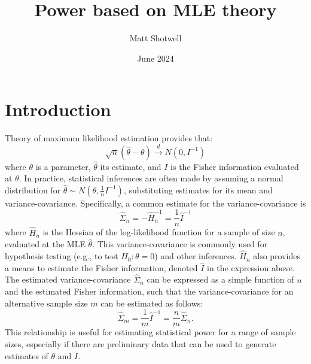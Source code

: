 \documentclass{article}
\title{Power based on MLE theory}
\author{Matt Shotwell}
\date{June 2024}
\begin{document}
\maketitle
\Large


\section{Introduction}
\noindent Theory of maximum likelihood estimation provides that:
$$
\sqrt{n}(\hat{\theta} - \theta) \stackrel{d}{\rightarrow} N(0, I^{-1})
$$
where $\theta$ is a parameter, $\hat{\theta}$ its estimate, and $I$ is the Fisher information evaluated at $\theta$. In practice, statistical inferences are often made by assuming a normal distribution for $\hat{\theta} \sim N(\theta, \frac{1}{n}I^{-1})$, substituting estimates for its mean and variance-covariance. Specifically, a common estimate for the variance-covariance is 
$$
\hat{\Sigma}_n = -\hat{H}_n^{-1} = \frac{1}{n}\hat{I}^{-1}
$$
where $\hat{H}_n$ is the Hessian of the log-likelihood function for a sample of size $n$, evaluated at the MLE $\hat{\theta}$. This variance-covariance is commonly used for hypothesis testing (e.g., to test $H_0: \theta = 0$) and other inferences. $\hat{H}_n$ also provides a means to estimate the Fisher information, denoted $\hat{I}$ in the expression above. The estimated variance-covariance $\hat{\Sigma}_n$ can be expressed as a simple function of $n$ and the estimated Fisher information, such that the variance-covariance for an alternative sample size $m$ can be estimated as follows:
$$
\hat{\Sigma}_m = \frac{1}{m}\hat{I}^{-1} = \frac{n}{m}\hat{\Sigma}_n.
$$
This relationship is useful for estimating statistical power for a range of sample sizes, especially if there are preliminary data that can be used to generate estimates of $\theta$ and $I$.
\end{document}
